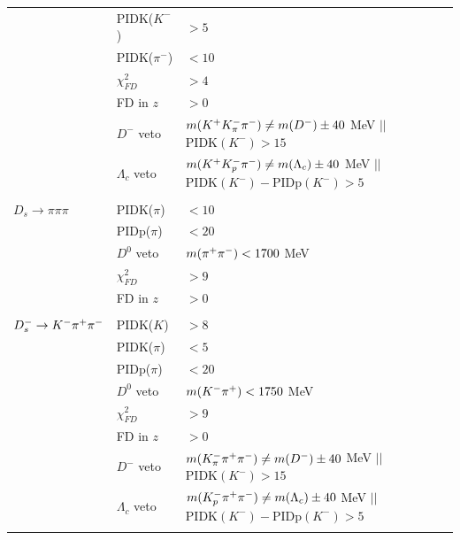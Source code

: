 \begin{table}[h]
{\begin{tabular}{l l l}
& PIDK($K^-$) & $> 5$ \\
& PIDK($\pi^-$) & $< 10$ \\
&  $\chi^{2}_{FD}$ & $> 4$ \\
&  FD in $z$  &$ > 0$ \\
& $D^-$ veto  & $m({{K}^+} K^-_\pi {\ensuremath{{\pi}^-}}) \ne m(D^-) \pm 40$ MeV  $||$ $\text{PIDK}(K^-) > 15$\\
& $\Lambda_c$ veto  & $m({{K}^+} K^-_p {{\pi}^-}) \ne m(\Lambda_c) \pm 40$ MeV  $||$ $\text{PIDK}(K^-)-\text{PIDp}(K^-) > 5$ \\
\\
$D_s \to \pi \pi \pi$ & PIDK($\pi$) & $< 10$  \\
& PIDp($\pi$) & $< 20$ \\
& $D^0$ veto  & $m({{\pi}^+} {{\pi}^-}) < 1700$ MeV \\
&  $\chi^{2}_{FD}$ & $> 9$ \\
&  FD in $z$  &$ > 0$ \\
\\
$D_s^- \rightarrow K^- {{\pi}^+} {{\pi}^-}$ & PIDK($K$) & $> 8$  \\
& PIDK($\pi$) & $< 5$ \\
& PIDp($\pi$) & $< 20$ \\
& $D^0$ veto  & $m(K^- {{\pi}^+}) < 1750$ MeV \\
&  $\chi^{2}_{FD}$ & $> 9$ \\
&  FD in $z$  &$ > 0$ \\
& $D^-$ veto  & $m(K^-_\pi {\ensuremath{{\pi}^+}} {\ensuremath{{\pi}^-}}) \ne m(D^-) \pm 40$ MeV  $||$ $\text{PIDK}(K^-) > 15$\\
& $\Lambda_c$ veto  & $m(K^-_p {{\pi}^+} {{\pi}^-}) \ne m(\Lambda_c) \pm 40$ MeV  $||$ $\text{PIDK}(K^-)-\text{PIDp}(K^-) > 5$ \\
\\
\hline
\hline
\end{tabular}
}
\label{table:selDs}
\end{table}


